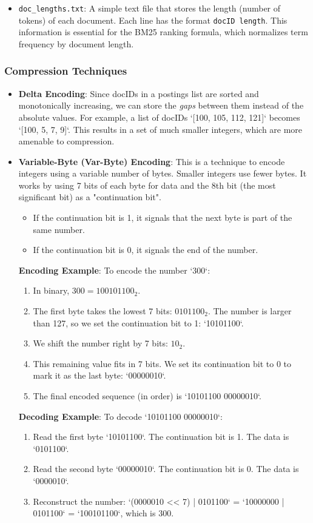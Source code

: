 \documentclass{article}
\begin{document}
\begin{itemize}
    \item \texttt{doc\_lengths.txt}: A simple text file that stores the length (number of tokens) of each document. Each line has the format \texttt{docID length}. This information is essential for the BM25 ranking formula, which normalizes term frequency by document length.
\end{itemize}


\subsubsection{Compression Techniques}
\begin{itemize}
    \item \textbf{Delta Encoding}: Since docIDs in a postings list are sorted and monotonically increasing, we can store the \textit{gaps} between them instead of the absolute values. For example, a list of docIDs `[100, 105, 112, 121]` becomes `[100, 5, 7, 9]`. This results in a set of much smaller integers, which are more amenable to compression.

    \item \textbf{Variable-Byte (Var-Byte) Encoding}: This is a technique to encode integers using a variable number of bytes. Smaller integers use fewer bytes. It works by using 7 bits of each byte for data and the 8th bit (the most significant bit) as a "continuation bit". 
    \begin{itemize}
        \item If the continuation bit is 1, it signals that the next byte is part of the same number.
        \item If the continuation bit is 0, it signals the end of the number.
    \end{itemize}
    \textbf{Encoding Example}: To encode the number `300`:
    \begin{enumerate}
        \item In binary, $300 = 100101100_2$.
        \item The first byte takes the lowest 7 bits: $0101100_2$. The number is larger than 127, so we set the continuation bit to 1: `10101100`.
        \item We shift the number right by 7 bits: $10_2$.
        \item This remaining value fits in 7 bits. We set its continuation bit to 0 to mark it as the last byte: `00000010`.
        \item The final encoded sequence (in order) is `10101100 00000010`.
    \end{enumerate}
    \textbf{Decoding Example}: To decode `10101100 00000010`:
    \begin{enumerate}
        \item Read the first byte `10101100`. The continuation bit is 1. The data is `0101100`.
        \item Read the second byte `00000010`. The continuation bit is 0. The data is `0000010`.
        \item Reconstruct the number: `(0000010 << 7) | 0101100` = `10000000 | 0101100` = `100101100`, which is 300.
    \end{enumerate}
\end{itemize}
\end{document}
